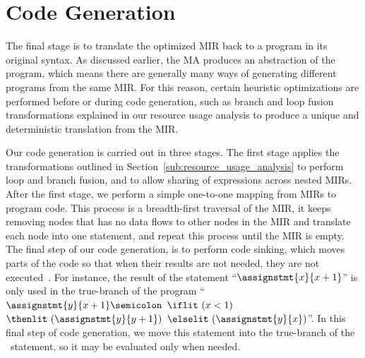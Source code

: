 \section{Code Generation}
\label{sec:code_generation}

The final stage is to translate the optimized MIR back to a program in its
original syntax.  As discussed earlier, the MA produces an abstraction of the
program, which means there are generally many ways of generating different
programs from the same MIR\@.  For this reason, certain heuristic optimizations
are performed before or during code generation, such as branch and loop fusion
transformations explained in our resource usage analysis to produce a unique
and deterministic translation from the MIR\@.

Our code generation is carried out in three stages.  The first stage applies
the transformations outlined in Section~\ref{sub:resource_usage_analysis} to
perform loop and branch fusion, and to allow sharing of expressions across
nested MIRs. After the first stage, we perform a simple one-to-one mapping
from MIRs to program code.  This process is a breadth-first traversal of
the MIR, it keeps removing nodes that has no data flows to other nodes
in the MIR and translate each node into one statement, and repeat this
process until the MIR is empty.  The final step of our code generation, is
to perform code sinking, which moves parts of the code so that when their
results are not needed, they are not executed~\cite{llvm}.  For instance,
the result of the statement ``$\assignstmt{x}{x + 1}$'' is only used in the
true-branch of the program ``$\assignstmt{y}{x + 1} \semicolon$ $\iflit~(x <
1)$ $\thenlit~(\assignstmt{y}{y + 1})$ $\elselit~(\assignstmt{y}{x})$''.  In
this final step of code generation, we move this statement into the true-branch
of the \iflit~statement, so it may be evaluated only when needed.
